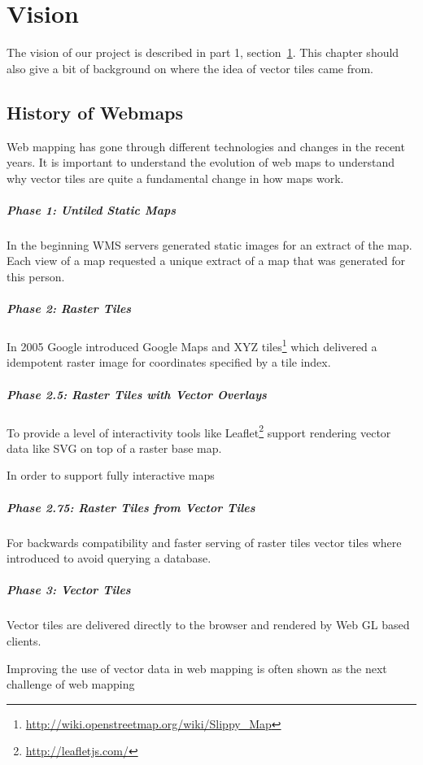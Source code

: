 \chapter{Vision}\label{vision}

The vision of our project is described in part 1, section~\ref{vision}. This chapter should also give a bit of background on where the idea of vector tiles came from.

\section{History of Webmaps}
\label{history-of-webmaps}

Web mapping has gone through different technologies and changes in
the recent years. It is important to understand the evolution of web maps to understand why vector tiles are quite a fundamental change in how maps work.

\paragraph{Phase 1: Untiled Static
Maps}

In the beginning WMS servers generated static images for an extract
of the map. Each view of a map requested a unique extract of a map that was generated for this person.

\paragraph{Phase 2: Raster Tiles}

In 2005 Google introduced Google Maps and XYZ 
tiles\footnote{\url{http://wiki.openstreetmap.org/wiki/Slippy_Map}}
which delivered a idempotent raster image for coordinates specified by a
tile index.

\paragraph{Phase 2.5: Raster Tiles with Vector
Overlays}

To provide a level of interactivity tools like
Leaflet\footnote{\url{http://leafletjs.com/}} support rendering vector
data like SVG on top of a raster base map.

In order to support fully interactive maps 

\paragraph{Phase 2.75: Raster Tiles from Vector
Tiles}

For backwards compatibility and faster serving of raster tiles vector
tiles where introduced to avoid querying a database.

\paragraph{Phase 3: Vector Tiles}

Vector tiles are delivered directly to the browser and rendered by Web
GL based clients.

Improving the use of vector data in web mapping is often shown as the next challenge
of web mapping \cite[p.~88]{gaffuri2012toward} 
